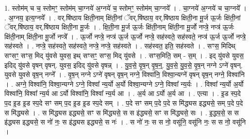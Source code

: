 \documentclass[17pt]{extarticle}
\begin{document}
1. स्तोम॑म् च च॒ स्तोमꣳ॒॒ स्तोम॑म् चा॒ग्नये॑ अ॒ग्नये॑ च॒ स्तोमꣳ॒॒ स्तोम॑म् चा॒ग्नये᳚ । . चा॒ग्नये॑ अ॒ग्नये॑ च चा॒ग्नये᳚ । . अ॒ग्नय॒ इत्य॒ग्नये᳚ । . वर्.षि॑ष्ठाय क्षिती॒नाम् क्षि॑ती॒नां ॅवर्.षि॑ष्ठाय॒ वर्.षि॑ष्ठाय क्षिती॒ना मू॒र्ज ऊ॒र्जः क्षि॑ती॒नां 
ॅवर्.षि॑ष्ठाय॒ वर्.षि॑ष्ठाय क्षिती॒ना मू॒र्जः । . क्षि॒ती॒ना मू॒र्ज ऊ॒र्जः क्षि॑ती॒नाम् क्षि॑ती॒ना मू॒र्जो नप्त्रे॒ नप्त्र॑ ऊ॒र्जः क्षि॑ती॒नाम् क्षि॑ती॒ना मू॒र्जो नप्त्रे᳚ । . ऊ॒र्जो नप्त्रे॒ नप्त्र॑ ऊ॒र्ज ऊ॒र्जो नप्त्रे॒ सह॑स्वते॒ सह॑स्वते॒ नप्त्र॑ ऊ॒र्ज ऊ॒र्जो नप्त्रे॒ सह॑स्वते । . नप्त्रे॒ सह॑स्वते॒ सह॑स्वते॒ नप्त्रे॒ नप्त्रे॒ सह॑स्वते । . सह॑स्वत॒ इति॒ सह॑स्वते । . सꣳस॒ मिदिथ् सꣳसꣳ॒॒ सꣳस॒ मिद् यु॑वसे युवस॒ इथ् सꣳसꣳ॒॒ सꣳस॒ मिद् यु॑वसे । . सꣳस॒मिति॒ सम् - स॒म् । . इद् यु॑वसे युवस॒ इदिद् यु॑वसे वृषन् वृषन्. युवस॒ इदिद् यु॑वसे वृषन्न् । . यु॒व॒से॒ वृ॒ष॒न् वृ॒ष॒न्॒. यु॒व॒से॒ यु॒व॒से॒ वृ॒ष॒न् नग्ने ऽग्ने॑ वृषन्. युवसे युवसे वृष॒न् नग्ने᳚ । . वृ॒ष॒न् नग्ने ऽग्ने॑ वृषन् वृष॒न् नग्ने॒ विश्वा॑नि॒ विश्वा॒न्यग्ने॑ वृषन् वृष॒न् नग्ने॒ विश्वा॑नि । . अग्ने॒ विश्वा॑नि॒ विश्वा॒न्यग्ने ऽग्ने॒ विश्वा᳚ न्य॒र्यो अ॒र्यो विश्वा॒न्यग्ने ऽग्ने॒ विश्वा᳚ न्य॒र्यः । . विश्वा᳚ न्य॒र्यो अ॒र्यो विश्वा॑नि॒ विश्वा᳚ न्य॒र्य आ ऽर्यो विश्वा॑नि॒ विश्वा᳚ न्य॒र्य आ । . अ॒र्य आ ऽर्यो अ॒र्य आ । . एत्या । . इ॒ड स्प॒दे प॒द इ॒ड इ॒ड स्प॒दे सꣳ सम् प॒द इ॒ड इ॒ड स्प॒दे सम् । . प॒दे सꣳ सम् प॒दे प॒दे स मि॑द्ध्यस इद्ध्यसे॒ सम् प॒दे प॒दे स मि॑द्ध्यसे । . स मि॑द्ध्यस इद्ध्यसे॒ सꣳ स मि॑द्ध्यसे॒ स स इ॑द्ध्यसे॒ सꣳ स मि॑द्ध्यसे॒ सः । . इ॒द्ध्य॒से॒ स स इ॑द्ध्यस इद्ध्यसे॒ स नो॑ नः॒ स इ॑द्ध्यस इद्ध्यसे॒ स नः॑ । . स नो॑ नः॒ स स नो॒ वसू॑नि॒ वसू॑नि नः॒ स स नो॒ वसू॑नि । \newline
\end{document}
